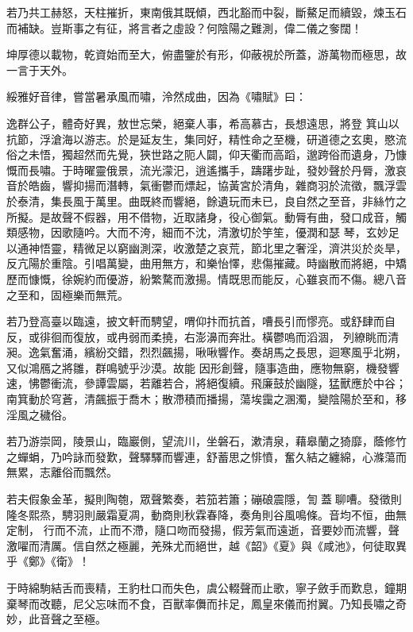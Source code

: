 \begin{pinyinscope}
 若乃共工赫怒，天柱摧折，東南俄其既傾，西北豁而中裂，斷鰲足而續毀，煉玉石而補缺。豈斯事之有征，將言者之虛設？何陰陽之難測，偉二儀之奓闊！



 坤厚德以載物，乾資始而至大，俯盡鑒於有形，仰蔽視於所蓋，游萬物而極思，故一言于天外。



 綏雅好音律，嘗當暑承風而嘯，泠然成曲，因為《嘯賦》曰：



 逸群公子，體奇好異，敖世忘榮，絕棄人事，希高慕古，長想遠思，將登
 箕山以抗節，浮滄海以游志。於是延友生，集同好，精性命之至機，研道德之玄奧，愍流俗之未悟，獨超然而先覺，狹世路之阨人闢，仰天衢而高蹈，邈跨俗而遺身，乃慷慨而長嘯。于時曜靈俄景，流光濛汜，逍遙攜手，躊躇步趾，發妙聲於丹脣，激哀音於皓齒，響抑揚而潛轉，氣衝鬱而熛起，協黃宮於清角，雜商羽於流徵，飄浮雲於泰清，集長風于萬里。曲既終而響絕，餘遺玩而未已，良自然之至音，非絲竹之所擬。是故聲不假器，用不借物，近取諸身，役心御氣。動脣有曲，發口成音，觸類感物，因歌隨吟。大而不洿，細而不沈，清激切於竽笙，優潤和瑟
 琴，玄妙足以通神悟靈，精微足以窮幽測深，收激楚之哀荒，節北里之奢淫，濟洪災於炎旱，反亢陽於重陰。引唱萬變，曲用無方，和樂怡懌，悲傷摧藏。時幽散而將絕，中矯歷而慷慨，徐婉約而優游，紛繁騖而激揚。情既思而能反，心雖哀而不傷。總八音之至和，固極樂而無荒。



 若乃登高臺以臨遠，披文軒而騁望，喟仰抃而抗首，嘈長引而憀亮。或舒肆而自反，或徘徊而復放，或冉弱而柔撓，右澎濞而奔壯。橫鬱嗚而滔涸，列繚眺而清昶。逸氣奮涌，繽紛交錯，烈烈飆揚，啾啾響作。奏胡馬之長思，迴寒風乎北朔，又似鴻鴈之將雛，群鳴號乎沙漠。故能
 因形創聲，隨事造曲，應物無窮，機發響速，怫鬱衝流，參譚雲屬，若離若合，將絕復續。飛廉鼓於幽隧，猛獸應於中谷；南箕動於穹蒼，清飆振于喬木；散滯積而播揚，蕩埃靄之溷濁，變陰陽於至和，移淫風之穢俗。



 若乃游崇岡，陵景山，臨巖側，望流川，坐磐石，漱清泉，藉皋蘭之猗靡，蔭修竹之蟬蜎，乃吟詠而發歎，聲驛驛而響連，舒蓄思之悱憤，奮久結之纏綿，心滌蕩而無累，志離俗而飄然。



 若夫假象金革，擬則陶匏，眾聲繁奏，若笳若簫；磞硠震隱，訇蓋聊嘈。發徵則隆冬熙烝，騁羽則嚴霜夏凋，動商則秋霖春降，奏角則谷風鳴條。音均不恒，曲無定制，
 行而不流，止而不滯，隨口吻而發揚，假芳氣而遠逝，音要妙而流響，聲激嚁而清厲。信自然之極麗，羌殊尤而絕世，越《韶》《夏》與《咸池》，何徒取異乎《鄭》《衛》！



 于時綿駒結舌而喪精，王豹杜口而失色，虞公輟聲而止歌，寧子斂手而歎息，鐘期棄琴而改聽，尼父忘味而不食，百獸率儛而拤足，鳳皇來儀而拊翼。乃知長嘯之奇妙，此音聲之至極。




\end{pinyinscope}
